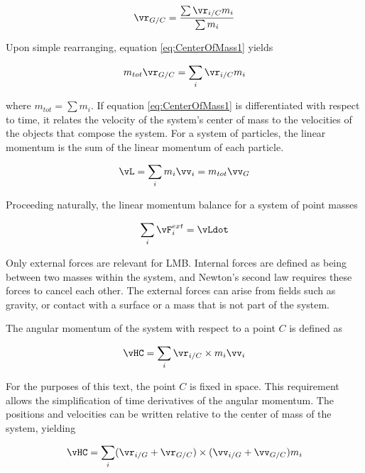 \begin{equation}
\vr_{G/C} = \frac{\sum \vr_{i/C} m_{i}}{\sum m_{i}}
\label{eq:CenterOfMass1}
\end{equation}

Upon simple rearranging, equation \ref{eq:CenterOfMass1} yields 

\begin{equation}
m_{tot} \vr_{G/C} = \sum_{i} \vr_{i/C} m_{i}
\label{eq:CenterofMass2}
\end{equation}

where $m_{tot} = \sum m_{i}$. If equation \ref{eq:CenterOfMass1} is differentiated with respect to time, it relates the velocity of the system's center of mass to the velocities of the objects that compose the system. For a system of particles, the linear momentum is the sum of the linear momentum of each particle.

\begin{equation}
\vL = \sum_{i} m_{i} \vv_{i} = m_{tot} \vv_{G}
\end{equation}

Proceeding naturally, the linear momentum balance for a system of point masses

\begin{equation}
\sum_{i} \vF_{i}^{ext} = \vLdot
\end{equation}

Only external forces are relevant for LMB. Internal forces are defined as being between two masses within the system, and Newton's second law requires these forces to cancel each other. The external forces can arise from fields such as gravity, or contact with a surface or a mass that is not part of the system.

The angular momentum of the system with respect to a point $C$ is defined as

\begin{equation}
\vHC = \sum_{i} \vr_{i/C} \times m_{i} \vv_{i}
\end{equation}

For the purposes of this text, the point $C$ is fixed in space. This requirement allows the simplification of time derivatives of the angular momentum. The positions and velocities can be written relative to the center of mass of the system, yielding

\begin{equation}
\vHC = \sum_{i} (\vr_{i/G} + \vr_{G/C}) \times (\vv_{i/G} + \vv_{G/C}) m_{i}
\end{equation}

